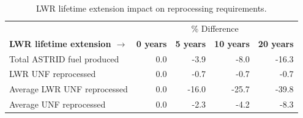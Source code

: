 \begin{table}[h]
	\centering
	\caption{\gls{LWR} lifetime extension impact on reprocessing requirements.}
	\begin{tabular}{lrrrr}
		\hline
		& \multicolumn{4}{c}{\% Difference} \\
		\textbf{\gls{LWR} lifetime extension $\longrightarrow$}& \textbf{0 years}& \textbf{5 years} & \textbf{10 years} & \textbf{20 years} \\
		\hline
		Total \gls{ASTRID} fuel produced & 0.0 & -3.9 & -8.0 & -16.3 \\
		\gls{LWR} \gls{UNF} reprocessed & 0.0  & -0.7 & -0.7 & -0.7 \\
		Average \gls{LWR} \gls{UNF} reprocessed & 0.0 & -16.0 & -25.7 & -39.8 \\
		Average \gls{UNF} reprocessed & 0.0 & -2.3 & -4.2 & -8.3 \\
		\hline
	\end{tabular}
	\label{tab:ext_met}
\end{table}
